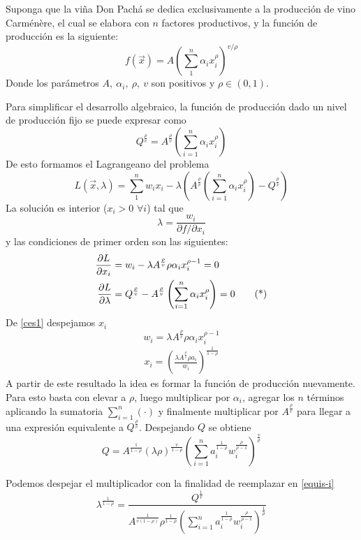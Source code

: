 \begin{ejemplo}\label{ejemplo-micro-2}
Suponga que la vi\~na Don Pach\'a se dedica exclusivamente a la producci\'on de vino Carm\'en\`ere, el cual se elabora con $n$ factores productivos, y la funci\'on de producci\'on es la siguiente:
$$f(\vec{x})= A\left(\sum_{1}^{n}{\alpha_i x_i^ \rho}\right)^{v / \rho}$$ 
Donde los par\'ametros $A,\:\alpha_i,\:\rho,\:v$ son positivos y $\rho\in(0,1)$. 

Para simplificar el desarrollo algebraico, la funci\'on de producci\'on dado un nivel de producci\'on fijo se puede expresar como
$$Q^{\frac{\rho}{v}} = A^{\frac{\rho}{v}} \left(\sum_{i=1}^n \alpha_i x_i^\rho \right)$$
De esto formamos el Lagrangeano del problema
$$L(\vec{x},\lambda) = \sum_{1}^n w_i x_i - \lambda \left(A^{\frac{\rho}{v}} \left(\sum_{i=1}^n \alpha_i x_i^\rho\right) - Q^{\frac{\rho}{v}} \right)$$
La soluci\'on es interior ($x_i >  0$ $\forall i$) tal que 
$$\lambda = \frac{w_i}{\partial f / \partial x_i}$$
y las condiciones de primer orden son las siguientes:
	\begin{align} 
	\frac{\partial L}{\partial x_i} &= w_i - \lambda A^{\frac{\rho}{v}} \rho \alpha_i x_i^{\rho - 1} = 0 \nonumber \\
	\label{ces1} \frac{\partial L}{\partial \lambda} &= Q^{\frac{\rho}{v}} - A^{\frac{\rho}{v}} \left(\sum_{i=1}^n \alpha_i x_i^\rho \right) = 0 \tag{*}
	\end{align}
De \eqref{ces1} despejamos $x_i$
$$w_i = \lambda A^{\frac{\rho}{v}} \rho \alpha_i x_i^{\rho - 1}$$
	\begin{gather} \label{equis-i}
	x_i = \left( \frac{\lambda A^{\frac{\rho}{v}}\rho a_i}{w_i} \right)^{\frac{1}{1-\rho}} \tag{**}
	\end{gather}
A partir de este resultado la idea es formar la funci\'on de producci\'on nuevamente. Para esto basta con elevar a $\rho$, luego multiplicar por $\alpha_i$, agregar los $n$ t\'erminos aplicando la sumatoria $\sum_{i=1}^n (\cdot)$ y finalmente multiplicar por $A^\frac{\rho}{v}$ para llegar a una expresi\'on equivalente a $Q^\frac{\rho}{v}$. Despejando $Q$ se obtiene
$$Q = A^{\frac{1}{1-\rho}} (\lambda \rho )^{\frac{v}{1-\rho}} \left( \sum_{i=1}^n a_i^{\frac{1}{1-\rho}} w_i^{\frac{\rho}{\rho -1}} \right)^{\frac{v}{\rho}}$$

Podemos despejar el multiplicador con la finalidad de reemplazar en \eqref{equis-i}
$$\lambda^{\frac{1}{1-\rho}} = \frac{Q^{\frac{1}{v}}}{A^{\frac{1}{v(1-\rho)}} \rho^{\frac{1}{1-\rho}} \left(\displaystyle \sum_{i=1}^n a_i^{\frac{1}{1-\rho}} w_i^{\frac{\rho}{\rho-1}} \right)^{\frac{1}{\rho}}}$$


\end{ejemplo}
